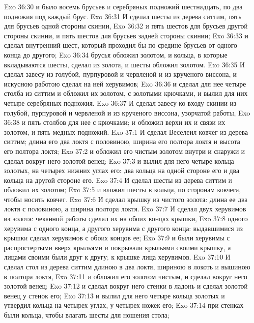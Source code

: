 \vs Exo 36:30 и было восемь брусьев и серебряных подножий шестнадцать, по два подножия под каждый брус.
\rsbpar\vs Exo 36:31 И сделал шесты из дерева ситтим, пять для брусьев одной стороны скинии,
\vs Exo 36:32 и пять шестов для брусьев другой стороны скинии, и пять шестов для брусьев задней стороны скинии;
\vs Exo 36:33 и сделал внутренний шест, который проходил бы по средине брусьев от одного конца до другого;
\vs Exo 36:34 брусья обложил золотом, и кольца, в которые вкладываются шесты, сделал из золота, и шесты обложил золотом.
\rsbpar\vs Exo 36:35 И сделал завесу из голубой, пурпуровой и червленой  и из крученого виссона, и искусною работою сделал на ней херувимов;
\vs Exo 36:36 и сделал для нее четыре столба из ситтим и обложил их золотом, с золотыми крючками, и вылил для них четыре серебряных подножия.
\vs Exo 36:37 И сделал завесу ко входу скинии из голубой, пурпуровой и червленой  и из крученого виссона, узорчатой работы,
\vs Exo 36:38 и пять столбов для нее с крючками; и обложил верхи их и связи их золотом, и  пять медных подножий.
\vs Exo 37:1 И сделал Веселеил ковчег из дерева ситтим; длина его два локтя с половиною, ширина его полтора локтя и высота его полтора локтя;
\vs Exo 37:2 и обложил его чистым золотом внутри и снаружи и сделал вокруг него золотой венец;
\vs Exo 37:3 и вылил для него четыре кольца золотых, на четырех нижних углах его: два кольца на одной стороне его и два кольца на другой стороне его.
\vs Exo 37:4 И сделал шесты из дерева ситтим и обложил их золотом;
\vs Exo 37:5 и вложил шесты в кольца, по сторонам ковчега, чтобы носить ковчег.
\vs Exo 37:6 И сделал крышку из чистого золота: длина ее два локтя с половиною, а ширина полтора локтя.
\vs Exo 37:7 И сделал двух херувимов из золота: чеканной работы сделал их на обоих концах крышки,
\vs Exo 37:8 одного херувима с одного конца, а другого херувима с другого конца: выдавшимися из крышки сделал херувимов с обоих концов ее;
\vs Exo 37:9 и были херувимы с распростертыми вверх крыльями и покрывали крыльями своими крышку, а лицами своими были  друг к другу; к крышке  лица херувимов.
\rsbpar\vs Exo 37:10 И сделал стол из дерева ситтим длиною в два локтя, шириною в локоть и вышиною в полтора локтя,
\vs Exo 37:11 и обложил его золотом чистым, и сделал вокруг него золотой венец;
\vs Exo 37:12 и сделал вокруг него стенки в ладонь и сделал золотой венец у стенок его;
\vs Exo 37:13 и вылил для него четыре кольца золотых и утвердил кольца на четырех углах, у четырех ножек его;
\vs Exo 37:14 при стенках были кольца, чтобы влагать шесты для ношения стола;

